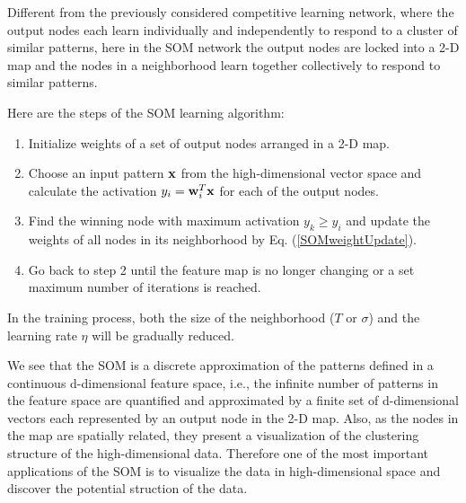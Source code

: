 \documentclass{article}
\begin{document}
Different from the previously considered competitive learning network, 
where the output nodes each learn individually and independently to 
respond to a cluster of similar patterns, here in the SOM network the 
output nodes are locked into a 2-D map and the nodes in a neighborhood
learn together collectively to respond to similar patterns. 

Here are the steps of the SOM learning algorithm:
\begin{enumerate}
\item Initialize weights of a set of output nodes arranged in a 2-D map.
\item Choose an input pattern ${\bf x}$ from the high-dimensional vector 
  space and calculate the activation $y_i={\bf w}^T_i{\bf x}$ for each of 
  the output nodes.
\item Find the winning node with maximum activation $y_k\ge y_i$ and update
  the weights of all nodes in its neighborhood by Eq. (\ref{SOMweightUpdate}).
\item Go back to step 2 until the feature map is no longer changing or a set
  maximum number of iterations is reached.  
\end{enumerate}

In the training process, both the size of the neighborhood ($T$ or $\sigma$) 
and the learning rate $\eta$ will be gradually reduced.

We see that the SOM is a discrete approximation of the patterns defined in 
a continuous d-dimensional feature space, i.e., the infinite number of 
patterns in the feature space are quantified and approximated by a finite 
set of d-dimensional vectors each represented by an output node in the 2-D 
map. Also, as the nodes in the map are spatially related, they present a 
visualization of the clustering structure of the high-dimensional data.
Therefore one of the most important applications of the SOM is to visualize
the data in high-dimensional space and discover the potential struction of
the data.
\end{document}
